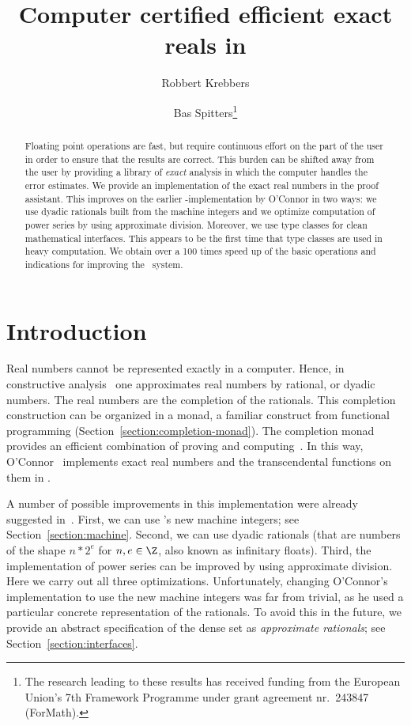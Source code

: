 \documentclass[a4paper,10pt,runningheads]{llncs}
\begin{document}
\title{Computer certified efficient exact reals in \Coq}
\author{Robbert Krebbers \and Bas Spitters\thanks{The research leading to these results has received funding from the European Union's 7th Framework Programme under grant agreement nr.~243847 (ForMath).}}
\maketitle

\begin{abstract}
Floating point operations are fast, but require continuous effort on the part of the user in order to ensure that the results are correct.
This burden can be shifted away from the user by providing a library of \emph{exact} analysis in which the computer handles the error estimates.
We provide an implementation of the exact real numbers in the \Coq{} proof assistant. This improves on the earlier \Coq-implementation by O'Connor in two ways: we use dyadic rationals built from the machine integers and we optimize computation of power series by using approximate division. Moreover, we use type classes for clean mathematical interfaces. This appears to be the first time that type classes are used in heavy computation. We obtain over a 100 times speed up of the basic operations and indications for improving the \Coq\ system.
\end{abstract}

\section{Introduction}
Real numbers cannot be represented exactly in a computer. Hence, in constructive analysis~\cite{Bishop67} one approximates real numbers by rational, or dyadic numbers. The real numbers are the completion of the rationals. This completion construction can be organized in a monad, a familiar construct from functional programming (Section~\ref{section:completion-monad}). The completion monad provides an efficient combination of proving and computing~\cite{OConnor:mscs}. In this way, O'Connor~\cite{Oconnor:real} implements exact real numbers and the transcendental functions on them in \Coq.

A number of possible improvements in this implementation were already suggested in~\cite{Riemann}. First, we can use \Coq's new machine integers; see Section~\ref{section:machine}. Second, we can use dyadic rationals (that are numbers of the shape $n * 2 ^ e$ for $n,e \in \Z$, also known as infinitary floats). Third, the implementation of power series can be improved by using approximate division. Here we carry out all three optimizations. Unfortunately, changing O'Connor's implementation to use the new machine integers was far from trivial, as he used a particular concrete representation of the rationals. To avoid this in the future, we provide an abstract specification of the dense set as \emph{approximate rationals}; see Section~\ref{section:interfaces}.
\end{document}
